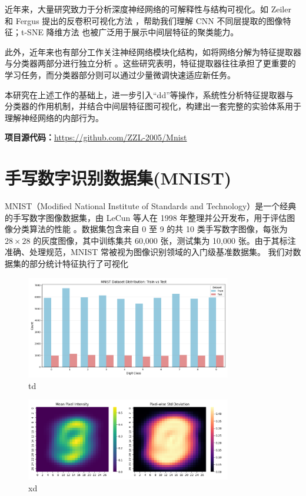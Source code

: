 \documentclass[12pt,a4paper]{article}
\begin{document}
近年来，大量研究致力于分析深度神经网络的可解释性与结构可视化。如 Zeiler 和 Fergus 提出的反卷积可视化方法 \cite{zeiler2014visualizing}，帮助我们理解 CNN 不同层提取的图像特征；t-SNE 降维方法 \cite{maaten2008visualizing} 也被广泛用于展示中间层特征的聚类能力。

此外，近年来也有部分工作关注神经网络模块化结构，如将网络分解为特征提取器与分类器两部分进行独立分析 \cite{yosinski2014transferable}。这些研究表明，特征提取器往往承担了更重要的学习任务，而分类器部分则可以通过少量微调快速适应新任务。

本研究在上述工作的基础上，进一步引入“dd”等操作，系统性分析特征提取器与分类器的作用机制，并结合中间层特征图可视化，构建出一套完整的实验体系用于理解神经网络的内部行为。

\textbf{项目源代码：}\url{https://github.com/ZZL-2005/Mnist}
\section{手写数字识别数据集(MNIST)}
MNIST（Modified National Institute of Standards and Technology）是一个经典的手写数字图像数据集，由 LeCun 等人在 1998 年整理并公开发布，用于评估图像分类算法的性能 \cite{lecun1998gradient}。数据集包含来自 0 至 9 的共 10 类手写数字图像，每张为 $28 \times 28$ 的灰度图像，其中训练集共 60,000 张，测试集为 10,000 张。由于其标注准确、处理规范，MNIST 常被视为图像识别领域的入门级基准数据集。
我们对数据集的部分统计特征执行了可视化
\begin{figure}[H]
    \centering
    \includegraphics[width=0.8\textwidth]{../images/bqfb.png}
    \caption{td}
    \label{fig:td}
\end{figure}
\begin{figure}[H]
    \centering
    \includegraphics[width=0.8\textwidth]{../images/xsfb.png}
    \caption{xd}
    \label{fig:xd}
\end{figure}
\end{document}
